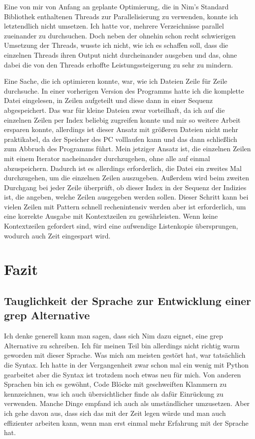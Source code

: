 \documentclass[11pt]{report}
\begin{document}
Eine von mir von Anfang an geplante Optimierung, die in Nim's Standard Bibliothek enthaltenen Threads zur Parallelisierung zu verwenden, konnte ich letztendlich nicht umsetzen. Ich hatte vor, mehrere Verzeichnisse parallel zueinander zu durchsuchen. Doch neben der ohnehin schon recht schwierigen Umsetzung der Threads, wusste ich nicht, wie ich es schaffen soll, dass die einzelnen Threads ihren Output nicht durcheinander ausgeben und das, ohne dabei die von den Threads erhoffte Leistungssteigerung zu sehr zu mindern.

Eine Sache, die ich optimieren konnte, war, wie ich Dateien Zeile für Zeile durchsuche. In einer vorherigen Version des Programms hatte ich die komplette Datei eingelesen, in Zeilen aufgeteilt und diese dann in einer Sequenz abgespeichert. Das war für kleine Dateien zwar vorteilhaft, da ich auf die einzelnen Zeilen per Index beliebig zugreifen konnte und mir so weitere Arbeit ersparen konnte, allerdings ist dieser Ansatz mit größeren Dateien nicht mehr praktikabel, da der Speicher des PC volllaufen kann und das dann schließlich zum Abbruch des Programms führt. Mein jetziger Ansatz ist, die einzelnen Zeilen mit einem Iterator nacheinander durchzugehen, ohne alle auf einmal abzuspeichern. Dadurch ist es allerdings erforderlich, die Datei ein zweites Mal durchzugehen, um die einzelnen Zeilen auszugeben. Außerdem wird beim zweiten Durchgang bei jeder Zeile überprüft, ob dieser Index in der Sequenz der Indizies ist, die angeben, welche Zeilen ausgegeben werden sollen. Dieser Schritt kann bei vielen Zeilen mit Pattern schnell rechenintensiv werden aber ist erforderlich, um eine korrekte Ausgabe mit Kontextzeilen zu gewährleisten.
Wenn keine Kontextzeilen gefordert sind, wird eine aufwendige Listenkopie übersprungen, wodurch auch Zeit eingespart wird.



\chapter{Fazit}
\section{Tauglichkeit der Sprache zur Entwicklung einer grep Alternative}
Ich denke generell kann man sagen, dass sich Nim dazu eignet, eine grep Alternative zu schreiben. Ich für meinen Teil bin allerdings nicht richtig warm geworden mit dieser Sprache. Was mich am meisten gestört hat, war tatsächlich die Syntax. Ich hatte in der Vergangenheit zwar schon mal ein wenig mit Python gearbeitet aber die Syntax ist trotzdem noch etwas neu für mich. Von anderen Sprachen bin ich es gewöhnt, Code Blöcke mit geschweiften Klammern zu kennzeichnen, was ich auch übersichtlicher finde als dafür Einrückung zu verwenden. Manche Dinge empfand ich auch als umständlicher umzusetzen.
\newline
Aber ich gehe davon aus, dass sich das mit der Zeit legen würde und man auch effizienter arbeiten kann, wenn man erst einmal mehr Erfahrung mit der Sprache hat.
\end{document}
